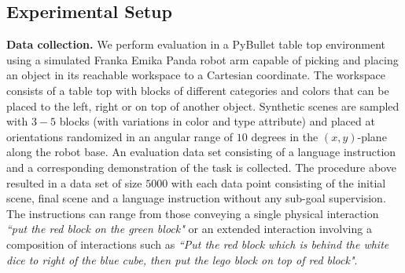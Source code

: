 \subsection{Experimental Setup}
\textbf{Data collection. } 
We perform evaluation in a PyBullet table top environment using a 
simulated Franka Emika Panda robot arm capable of picking and placing 
an object in its reachable workspace to a Cartesian coordinate. 
%
The workspace consists of a table top with 
blocks of different categories and colors that can be placed to the 
left, right or on top of another object.
%
Synthetic scenes are sampled with $3-5$ blocks (with variations in color and type attribute) and placed at orientations randomized in an angular range of $10$ degrees in the $(x,y)$-plane along the robot base. 
%
An evaluation data set consisting of a language instruction 
and a corresponding demonstration of the task is collected. 
%
The procedure above resulted in a data set of size $5000$ with each data point consisting of the initial scene, final scene and a language instruction without any sub-goal supervision. 
%
The instructions can range from those conveying a single physical interaction \emph{``put the red block on the green block"} or an extended interaction involving a composition of interactions such as \emph{``Put the red block which is behind the white dice to right of the blue cube, then put the lego block on top of red block"}. 
%

